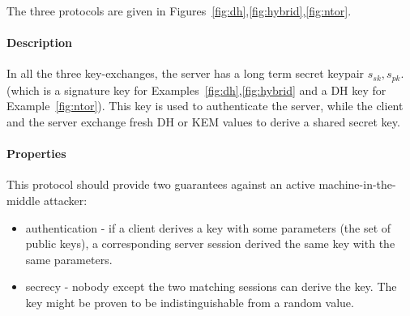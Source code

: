 \documentclass{article}
\newcommand{\sfsk}{\mathit{sk}}
\newcommand{\sfpk}{\mathit{pk}}
\begin{document}
The three protocols are given in Figures~\ref{fig:dh},\ref{fig:hybrid},\ref{fig:ntor}.

 \paragraph{Description}In all the three key-exchanges, the server has a long term secret keypair $s_\sfsk,s_\sfpk$. (which is a signature key for Examples~\ref{fig:dh},\ref{fig:hybrid} and a DH key for Example~\ref{fig:ntor}).
This key is used to authenticate the server, while the client and the server exchange fresh DH or KEM values to derive a shared secret key.

\paragraph{Properties} This protocol should provide two guarantees against an active machine-in-the-middle attacker:
\begin{itemize}
\item authentication - if a client derives a key with some parameters (the set of public keys), a corresponding server session derived the same key with the same parameters.
\item secrecy - nobody except the two matching sessions can derive the key.  The key might be proven to be indistinguishable from a random value.
\end{itemize}
\end{document}

